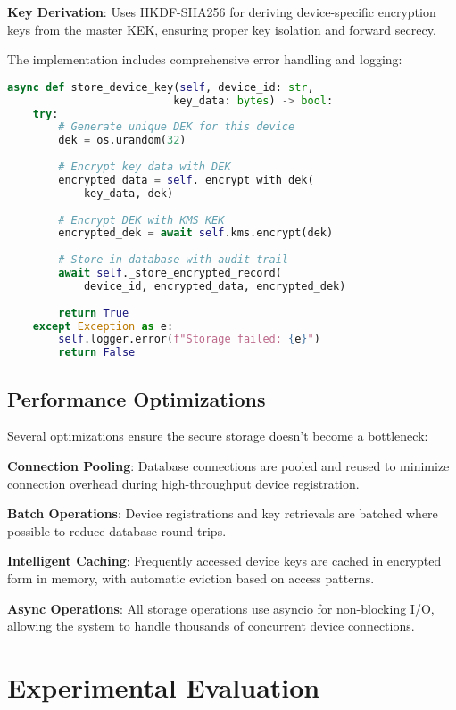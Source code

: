 \documentclass[onecolumn,11pt]{article}
\begin{document}
\textbf{Key Derivation}: Uses HKDF-SHA256 for deriving device-specific encryption keys from the master KEK, ensuring proper key isolation and forward secrecy.

The implementation includes comprehensive error handling and logging:

\begin{lstlisting}[language=Python, basicstyle=\footnotesize\ttfamily]
async def store_device_key(self, device_id: str, 
                          key_data: bytes) -> bool:
    try:
        # Generate unique DEK for this device
        dek = os.urandom(32)
        
        # Encrypt key data with DEK
        encrypted_data = self._encrypt_with_dek(
            key_data, dek)
        
        # Encrypt DEK with KMS KEK  
        encrypted_dek = await self.kms.encrypt(dek)
        
        # Store in database with audit trail
        await self._store_encrypted_record(
            device_id, encrypted_data, encrypted_dek)
            
        return True
    except Exception as e:
        self.logger.error(f"Storage failed: {e}")
        return False
\end{lstlisting}

\subsection{Performance Optimizations}

Several optimizations ensure the secure storage doesn't become a bottleneck:

\textbf{Connection Pooling}: Database connections are pooled and reused to minimize connection overhead during high-throughput device registration.

\textbf{Batch Operations}: Device registrations and key retrievals are batched where possible to reduce database round trips.

\textbf{Intelligent Caching}: Frequently accessed device keys are cached in encrypted form in memory, with automatic eviction based on access patterns.

\textbf{Async Operations}: All storage operations use asyncio for non-blocking I/O, allowing the system to handle thousands of concurrent device connections.

\section{Experimental Evaluation}
\label{sec:evaluation}
\end{document}
